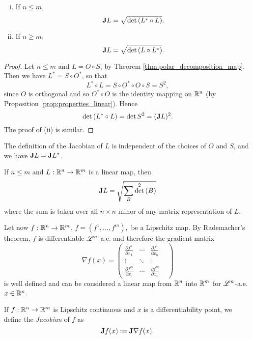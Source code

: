 \begin{theorem} \hfill
\begin{enumerate}[i)]
\item If $n \le m$, $${\bf J} L = \sqrt{\det{(L^{*} \circ L)}}.$$
\item If $n \ge m$, $${\bf J} L = \sqrt{\det{(L \circ L^{*})}}.$$
\end{enumerate}
\end{theorem}
\begin{proof}
Let $n \le m$ and $L = O \circ S$, by Theorem \ref{thm:polar_decomposition_map}. Then we have $L^{*} = S \circ O^{*}$, so that $$L^{*} \circ L = S \circ O^{*} \circ O \circ S = S^{2},$$ since $O$ is orthogonal and so $O^{*} \circ O$ is the identity mapping on $\mathbb{R}^{n}$ (by Proposition \ref{prop:properties_linear}). Hence $$\det{(L^{*} \circ L)} = \det{S^{2}} = ({\bf J} L)^{2}.$$
The proof of (ii) is similar.
\end{proof}

\begin{remark}
The definition of the Jacobian of $L$ is independent of the choices of $O$ and $S$, and we have ${\bf J} L = {\bf J} L^{*}$.
\end{remark}

\begin{proposition} \label{Cauchy_Binet}
If $n \le m$ and $L: \mathbb{R}^{n} \to \mathbb{R}^{m}$ is a linear map, then
\begin{equation*}
{\bf J} L = \sqrt{ \sum_{B} \det^{2}{(B)}}
\end{equation*}
where the sum is taken over all $n\times n$ minor of any matrix representation of $L$.
\end{proposition}

Let now $f : \mathbb{R}^{n} \to \mathbb{R}^{m}$, $f = (f^{1}, \dots, f^{m}),$ be a Lipschitz map. By Rademacher's theorem, $f$ is differentiable $\mathscr{L}^{n}$-a.e. and therefore the gradient matrix 
\[\nabla f(x) = \begin{pmatrix} \frac{\partial f^{1}}{\partial x_{1}} & \cdots & \frac{\partial f^{1}}{\partial x_{n}} & \\ \vdots & \ddots & \vdots \\  \frac{\partial f^{m}}{\partial x_{1}} & \cdots & \frac{\partial f^{m}}{\partial x_{n}} & \end{pmatrix}\]
is well defined and can be considered a linear map from $\mathbb{R}^{n}$ into $\mathbb{R}^{m}$ for $\mathscr{L}^{n}$-a.e. $x \in \mathbb{R}^{n}$.

\begin{definition}
If $f : \mathbb{R}^{n} \to \mathbb{R}^{m}$ is Lipschitz continuous and $x$ is a differentiability point, we define the {\em Jacobian} of $f$ as $${\bf J} f(x) := {\bf J} \nabla f(x).$$
\end{definition}

